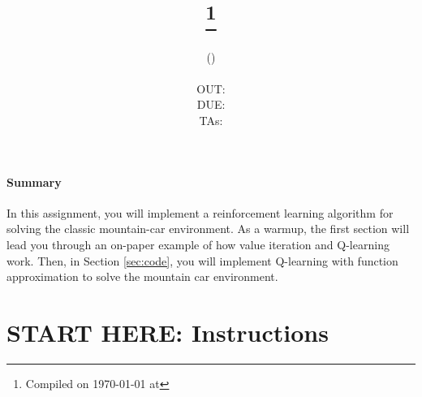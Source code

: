 \documentclass[11pt,addpoints,answers]{exam}
\title{\textsc{\hwNum}\\
\textsc{\hwTopic}
\thanks{Compiled on \today{} at \currenttime{}}\\
\vspace{1em}
} %
\author{\textsc{\large \courseNum \courseName (\courseSem)}\\
\courseUrl
\vspace{1em}\\
  OUT: \outDate \\
  DUE: \dueDate \\
  TAs: \taNames
}
\date{}
\date{}
\begin{document}
\maketitle

\begin{notebox}
\paragraph{Summary} In this assignment, you will implement a reinforcement learning algorithm for solving the classic mountain-car environment. As a warmup, the first section will lead you through an on-paper example of how value iteration and Q-learning work. Then, in Section \ref{sec:code}, you will implement Q-learning with function approximation to solve the mountain car environment.
\end{notebox}\section*{START HERE: Instructions}
\end{document}
